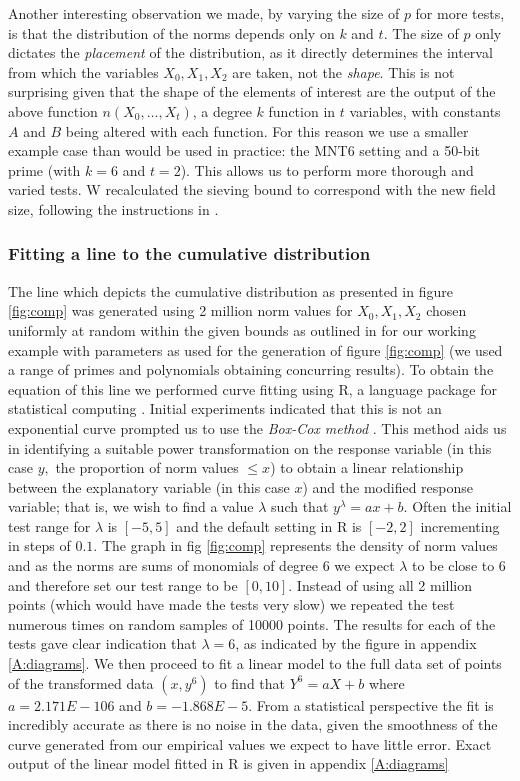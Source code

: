 \documentclass[a4paper, 10pt, envcountsect, runningheads]{lms}
\numberwithin{figure}{section}
\numberwithin{equation}{section}
\begin{document}
Another interesting observation we made, by varying the size of $p$ for more tests, is that the distribution of the norms depends only on $k$ and $t$. The size of $p$ only dictates the \textit{placement} of the distribution, as it directly determines the interval from which the variables $X_0,X_1,X_2$ are taken, not the \textit{shape}. This is not surprising given that the shape of the elements of interest are the output of the above function $n(X_0,\ldots,X_t)$, a degree $k$ function in $t$ variables, with constants $A$ and $B$ being altered with each function. For this reason we use a smaller example case than would be used in practice: the MNT6 setting and a 50-bit prime (with $k=6$ and $t=2$). This allows us to perform more thorough and varied tests. W recalculated the sieving bound to correspond with the new field size, following the instructions in \cite{joux-lercier-smart-vercauteren06}.


\subsubsection*{Fitting a line to the cumulative distribution}
The line which depicts the cumulative distribution as presented in figure \ref{fig:comp} was generated using 2 million norm values for $X_0,X_1,X_2$ chosen uniformly at random within the given bounds as outlined in \cite{joux-lercier-smart-vercauteren06} for our working example with parameters as used for the generation of figure \ref{fig:comp} (we used a range of primes and polynomials obtaining concurring results). To obtain the equation of this line we performed curve fitting using R, a language package for statistical computing \cite{R}. Initial experiments indicated that this is not an exponential curve prompted us to use the {\em Box-Cox method} \cite{box-cox}. This method aids us in identifying a suitable power transformation on the response variable (in this case $y,$ the proportion of norm values $\leq x$) to obtain a linear relationship between the explanatory variable (in this case $x$) and the modified response variable; that is, we wish to find a value $\lambda$ such that $y^\lambda=ax+b$. Often the initial test range for $\lambda$ is $[-5,5]$ and the default setting in R is $[-2,2]$ incrementing in steps of $0.1$. The graph in fig \ref{fig:comp} represents the density of norm values and as the norms are sums of monomials of degree 6 we expect $\lambda$ to be close to 6 and therefore set our test range to be $[0,10]$. Instead of using all 2 million points (which would have made the tests very slow) we repeated the test numerous times on random samples of 10000 points. The results for each of the tests gave clear indication that $\lambda=6$, as indicated by the figure in appendix \ref{A:diagrams}. 
We then proceed to fit a linear model to the full data set of points of the transformed data $(x,y^6)$ to find that $Y^6=aX+b$ where $a=2.171E-106$ and $b=-1.868E-5$. From a statistical perspective the fit is incredibly accurate as there is no noise in the data, given the smoothness of the curve generated from our empirical values we expect to have little error. Exact output of the linear model fitted in R is given in appendix \ref{A:diagrams}
\end{document}
